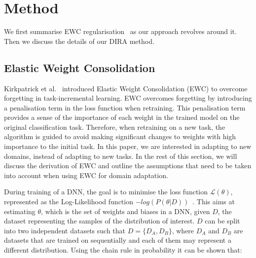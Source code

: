 \section{Method} \label{sec:method}
We first summarise EWC regularisation~\cite{kirkpatrick2017overcoming} as our approach revolves around it. Then we discuss the details of our DIRA method.

\subsection{Elastic Weight Consolidation}\label{sec:EWC}
Kirkpatrick et al.~\cite{kirkpatrick2017overcoming} introduced Elastic Weight Consolidation (EWC) to overcome forgetting in task-incremental learning. 
%
EWC overcomes forgetting by introducing a penalisation term in the loss function when retraining. 
%
This penalisation term provides a sense of the importance of each weight in the trained model on the original classification task. 
%
Therefore, when retraining on a new task, the algorithm is guided to avoid making significant changes to weights with high importance to the initial task.
%
In this paper, we are interested in adapting to new domains, instead of adapting to new tasks. 
%
In the rest of this section, we will discuss the derivation of EWC and outline the assumptions that need to be taken into account when using EWC for domain adaptation. 


During training of a DNN, the goal is to minimise the loss function $\mathcal{L}(\theta)$, represented as the Log-Likelihood function $-log(P(\theta|D))$~\cite{GoodBengCour2016}.
%
This aims at estimating $\theta$, which is the set of weights and biases in a DNN, given $D$, the dataset representing the samples of the distribution of interest.
%
$D$ can be split into two independent datasets such that $D=\{D_A, D_B\}$, where $D_A$ and $D_B$ are datasets that are trained on sequentially and each of them may represent a different distribution. 
%
Using the chain rule in probability it can be shown that: 

